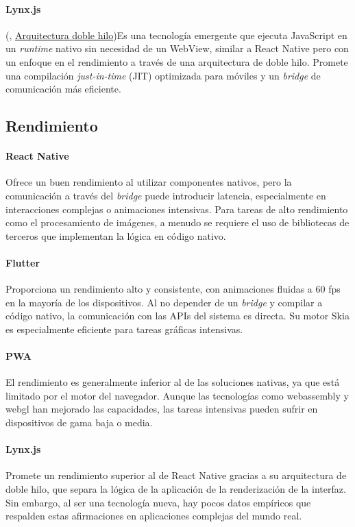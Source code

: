 \paragraph{Lynx.js}
(\cite{lynx-documentation}, \href{https://lynxjs.org/react/lifecycle.html#dual-thread-architecture-design}{Arquitectura doble hilo})Es una tecnología emergente que ejecuta JavaScript en un \textit{runtime} nativo sin necesidad de un WebView, similar a React Native pero con un enfoque en el rendimiento a través de una arquitectura de doble hilo. Promete una compilación \textit{just-in-time} (JIT) optimizada para móviles y un \textit{bridge} de comunicación más eficiente.

\subsection{Rendimiento}

\paragraph{React Native}
Ofrece un buen rendimiento al utilizar componentes nativos, pero la comunicación a través del \textit{bridge} puede introducir latencia, especialmente en interacciones complejas o animaciones intensivas. Para tareas de alto rendimiento como el procesamiento de imágenes, a menudo se requiere el uso de bibliotecas de terceros que implementan la lógica en código nativo.

\paragraph{Flutter}
Proporciona un rendimiento alto y consistente, con animaciones fluidas a 60 \acrshort{fps} en la mayoría de los dispositivos. Al no depender de un \textit{bridge} y compilar a código nativo, la comunicación con las APIs del sistema es directa. Su motor Skia es especialmente eficiente para tareas gráficas intensivas.

\paragraph{PWA}
El rendimiento es generalmente inferior al de las soluciones nativas, ya que está limitado por el motor del navegador. Aunque las tecnologías como \gls{webassembly} y \gls{webgl} han mejorado las capacidades, las tareas intensivas pueden sufrir en dispositivos de gama baja o media.

\paragraph{Lynx.js}
Promete un rendimiento superior al de React Native gracias a su arquitectura de doble hilo, que separa la lógica de la aplicación de la renderización de la interfaz. Sin embargo, al ser una tecnología nueva, hay pocos datos empíricos que respalden estas afirmaciones en aplicaciones complejas del mundo real.

